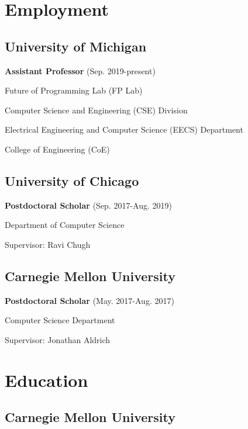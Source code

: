 \documentclass[10pt,letterpaper]{article}
\renewenvironment{itemize}{
  \begin{list}{}{
    \setlength{\leftmargin}{1.25em}
    \setlength{\itemsep}{0.25em}
    \setlength{\parskip}{0pt}
    \setlength{\parsep}{0.2em}
  }
}{
  \end{list}
}
\begin{document}
\section*{Employment}

\subsection*{University of Michigan}
\begin{itemize}
  \item \textbf{Assistant Professor} (Sep. 2019-present)
  \item Future of Programming Lab (FP Lab)
  \item Computer Science and Engineering (CSE) Division
  \item Electrical Engineering and Computer Science (EECS) Department
  \item College of Engineering (CoE)
\end{itemize}

\subsection*{University of Chicago}
\begin{itemize}
  \item \textbf{Postdoctoral Scholar} (Sep. 2017-Aug. 2019)
  \item Department of Computer Science
  \item Supervisor: Ravi Chugh
\end{itemize}

\subsection*{Carnegie Mellon University}
\begin{itemize}
  \item \textbf{Postdoctoral Scholar} (May. 2017-Aug. 2017)
  \item Computer Science Department
  \item Supervisor: Jonathan Aldrich
\end{itemize}


\section*{Education}

\subsection*{Carnegie Mellon University}
\end{document}
